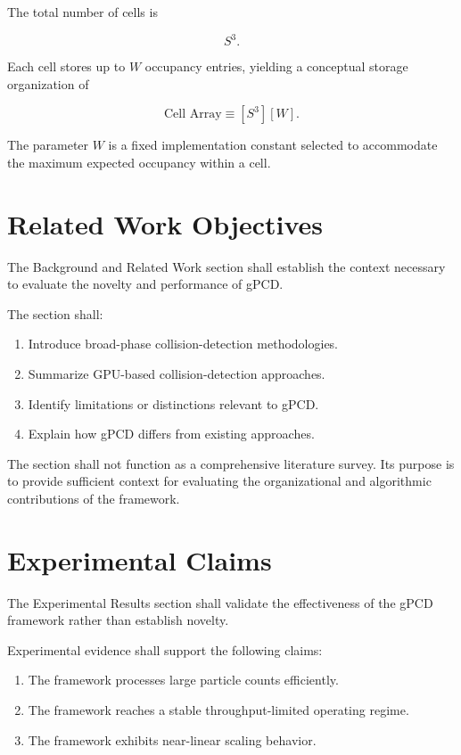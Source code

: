 The total number of cells is

\begin{equation}
S^3.
\end{equation}

Each cell stores up to $W$ occupancy entries, yielding a conceptual
storage organization of

\begin{equation}
\text{Cell Array} \equiv [S^3][W].
\end{equation}

The parameter $W$ is a fixed implementation constant selected to
accommodate the maximum expected occupancy within a cell.

\section{Related Work Objectives}

The Background and Related Work section shall establish the context
necessary to evaluate the novelty and performance of gPCD.

The section shall:

\begin{enumerate}
\item Introduce broad-phase collision-detection methodologies.
\item Summarize GPU-based collision-detection approaches.
\item Identify limitations or distinctions relevant to gPCD.
\item Explain how gPCD differs from existing approaches.
\end{enumerate}

The section shall not function as a comprehensive literature survey.
Its purpose is to provide sufficient context for evaluating the
organizational and algorithmic contributions of the framework.



\section{Experimental Claims}

The Experimental Results section shall validate the effectiveness of the
gPCD framework rather than establish novelty.

Experimental evidence shall support the following claims:

\begin{enumerate}
\item The framework processes large particle counts efficiently.
\item The framework reaches a stable throughput-limited operating regime.
\item The framework exhibits near-linear scaling behavior.
\end{enumerate}

